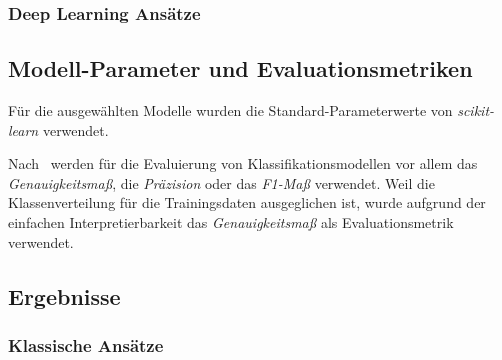 \subsubsection{Deep Learning Ansätze} \label{sec:deep-learning-ansaetze}

\subsection{Modell-Parameter und Evaluationsmetriken}

Für die ausgewählten Modelle wurden die Standard-Parameterwerte von \textit{scikit-learn} verwendet.

Nach~\cite{wankhade2022survey} werden für die Evaluierung von Klassifikationsmodellen vor allem das \textit{Genauig\-keits\-maß}, die \textit{Präzision} oder das \textit{F1-Maß} verwendet.
Weil die Klassenverteilung für die Trainingsdaten ausgeglichen ist, wurde aufgrund der einfachen Interpretierbarkeit das \textit{Genauigkeitsmaß} als Evaluationsmetrik verwendet.

\subsection{Ergebnisse}

\subsubsection{Klassische Ansätze}

